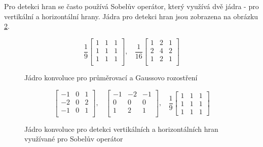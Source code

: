 Pro detekci hran se často používá Sobelův operátor, který využívá dvě jádra -
pro vertikální a horizontální hrany. Jádra pro detekci hran jsou zobrazena na
obrázku \ref{fig:sobel}.

\begin{figure}[]
    \centering
    \begin{equation*}
        {\displaystyle {\frac {1}{9}}{
                \begin{bmatrix}
                    1 & 1 & 1 \\
                    1 & 1 & 1 \\
                    1 & 1 & 1 \\
                \end{bmatrix}},\ \ \ \ }
        {\displaystyle {\frac {1}{16}}{
                \begin{bmatrix}
                    1 & 2 & 1 \\
                    2 & 4 & 2 \\
                    1 & 2 & 1 \\
                \end{bmatrix}}}
    \end{equation*}

    \caption{Jádro konvoluce pro průměrovací a Gaussovo rozostření}
    \label{fig:blur}
\end{figure}
\begin{figure}[]
    \centering
    \begin{equation*}
        {\displaystyle {
                \begin{bmatrix}
                    -1 & 0 & 1 \\
                    -2 & 0 & 2 \\
                    -1 & 0 & 1 \\
                \end{bmatrix}},\ \ \ \ }
        {\displaystyle {
                \begin{bmatrix}
                    -1 & -2 & -1 \\
                    0  & 0  & 0  \\
                    1  & 2  & 1  \\
                \end{bmatrix}},\ \ \ \ }
        {\displaystyle {\frac {1}{9}}{\begin{bmatrix} 1& 1& 1\\ 1& 1& 1\\ 1& 1& 1\end{bmatrix}}}
    \end{equation*}

    \caption{Jádro konvoluce pro detekci vertikálních a horizontálních hran využívané pro Sobelův operátor}
    \label{fig:sobel}
\end{figure}

